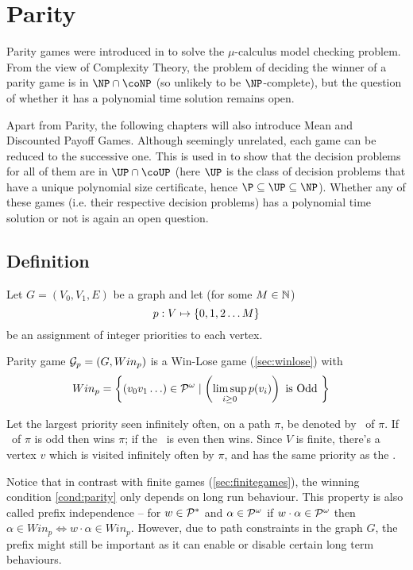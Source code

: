 \chapter{Parity}
\label{chap:par}
Parity games were introduced in \cite{emersonjutla} to solve the $\mu$-calculus model checking problem. From the view of Complexity Theory, the problem of deciding the winner of a parity game is in $\NP \cap \coNP$ (so unlikely to be $\NP$-complete), but the question of whether it has a polynomial time solution remains open.

Apart from Parity, the following chapters will also introduce Mean and Discounted Payoff Games. Although seemingly unrelated, each game can be reduced to the successive one. This is used in \cite{parityup} to show that the decision problems for all of them are in $\UP \cap \coUP$ (here $\UP$ is the class of decision problems that have a unique polynomial size certificate, hence $\P \subseteq \UP \subseteq \NP$). Whether any of these games (i.e. their respective decision problems) has a polynomial time solution or not is again an open question.

\section{Definition}
Let $G=(V_0,V_1,E)$ be a graph and let (for some $M \in \mathbb{N}$)
\[
    p : V \mapsto \left\{0,1,2 \ldots M\right\}
\]
be an assignment of integer priorities to each vertex.

Parity game $\mathcal{G}_p=(G,Win_p)$ is a Win-Lose game (\autoref{sec:winlose}) with
\begin{align}
    Win_p &= \left\{ \left(v_0 v_1 \ldots\right) \in \mathcal{P}^\omega \mid \left(\limsup_{i \geq 0} p(v_i)\right)  \text{ is Odd }\right\} \label{cond:parity}
\end{align}

Let the largest priority seen infinitely often, on a path $\pi$, be denoted by \mip\ of $\pi$. If \mip\ of $\pi$ is odd then  wins $\pi$; if the \mip\ is even then  wins. Since $V$ is finite, there's a vertex $v$ which is visited infinitely often by $\pi$, and has the same priority as the \mip.

Notice that in contrast with finite games (\autoref{sec:finitegames}), the winning condition \eqref{cond:parity} only depends on long run behaviour. This property is also called prefix independence -- for $w \in \mathcal{P}^{*}$ and $\alpha \in \mathcal{P}^\omega$ if $w \cdot \alpha \in \mathcal{P}^\omega$ then $\alpha \in Win_p \iff w \cdot \alpha \in Win_p$. However, due to path constraints in the graph $G$, the prefix might still be important as it can enable or disable certain long term behaviours.


